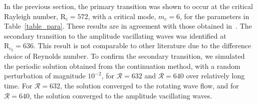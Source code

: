In the previous section, the primary transition was shown to occur at the critical Rayleigh number, $\mathrm{R}_c = 572$, with a critical mode, $ m_c = 6$, for the parameters in Table~\ref{table_para}. These results are in agreement with those obtained in~\cite{PeiChunTsain}.
The secondary transition to the amplitude vacillating waves was identified at $\mathrm{R}_{c_2} = 636$. This result is not comparable to other literature due to the difference choice of Reynolds number. To confirm the secondary transition, we simulated the periodic solution obtained from the continuation method, with a random perturbation of magnitude $10^{-2}$, for $\mathcal{R} = 632$ and $\mathcal{R} = 640$ over relatively long time. For $\mathcal{R} = 632$, the solution converged to the rotating wave flow, and for $\mathcal{R} = 640$, the solution converged to the amplitude vacillating waves.












